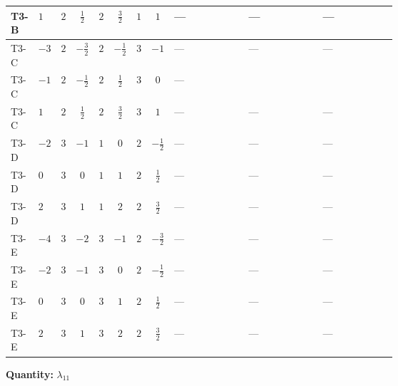 \documentclass[8pt]{article}
\begin{document}
\begin{landscape}
\begin{longtable}{@{}llcccccc >{\raggedright\arraybackslash}p{0.21\linewidth} >{\raggedright\arraybackslash}p{0.21\linewidth} >{\raggedright\arraybackslash}p{0.21\linewidth}@{}}
\midrule
T3-B & $1$ & $2$ & $\frac{1}{2}$ & $2$ & $\frac{3}{2}$ & $1$ & $1$ & --- & --- & --- \\
\midrule
T3-C & $-3$ & $2$ & $-\frac{3}{2}$ & $2$ & $-\frac{1}{2}$ & $3$ & $-1$ & --- & --- & --- \\
\midrule
T3-C & $-1$ & $2$ & $-\frac{1}{2}$ & $2$ & $\frac{1}{2}$ & $3$ & $0$ & --- & \scriptsize\adjustbox{max width=\linewidth}{$\begin{gathered} +4 {\lambda_{9}} (\left({\lambda_{10}}\right)^{*}+5 \left({\lambda_{11}}\right)^{*})\end{gathered}$} & \scriptsize\adjustbox{max width=\linewidth}{$\begin{gathered} -9 {g_2}^2 {\lambda_{11}}\end{gathered}$} \\
\midrule
T3-C & $1$ & $2$ & $\frac{1}{2}$ & $2$ & $\frac{3}{2}$ & $3$ & $1$ & --- & --- & --- \\
\midrule
T3-D & $-2$ & $3$ & $-1$ & $1$ & $0$ & $2$ & $-\frac{1}{2}$ & --- & --- & --- \\
\midrule
T3-D & $0$ & $3$ & $0$ & $1$ & $1$ & $2$ & $\frac{1}{2}$ & --- & --- & --- \\
\midrule
T3-D & $2$ & $3$ & $1$ & $1$ & $2$ & $2$ & $\frac{3}{2}$ & --- & --- & --- \\
\midrule
T3-E & $-4$ & $3$ & $-2$ & $3$ & $-1$ & $2$ & $-\frac{3}{2}$ & --- & --- & --- \\
\midrule
T3-E & $-2$ & $3$ & $-1$ & $3$ & $0$ & $2$ & $-\frac{1}{2}$ & --- & --- & --- \\
\midrule
T3-E & $0$ & $3$ & $0$ & $3$ & $1$ & $2$ & $\frac{1}{2}$ & --- & --- & --- \\
\midrule
T3-E & $2$ & $3$ & $1$ & $3$ & $2$ & $2$ & $\frac{3}{2}$ & --- & --- & --- \\
\midrule
\bottomrule
\end{longtable}
\clearpage
\noindent\textbf{Quantity: }$\lambda_{11}$\par\smallskip

\end{landscape}
\end{document}
